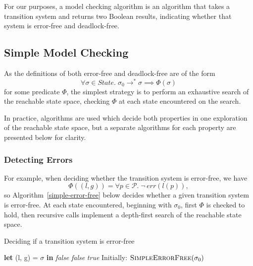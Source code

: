 \documentclass[12pt,a4paper,twoside,openright]{report}
\newcommand{\Let}[2]{\State \textbf{let} #1 = #2 \textbf{in}}
\begin{document}
For our purposes, a model checking algorithm is an
algorithm that takes a transition system and returns
two Boolean results, indicating whether that system
is error-free and deadlock-free.

\subsection{Simple Model Checking} \label{sec:simple-model-checking}
As the definitions of both error-free and deadlock-free
are of the form
\[
	\forall \sigma \in \textit{State}.\; \sigma_0 \longrightarrow^* \sigma
	\implies \Phi (\sigma)
\]
for some predicate $\Phi$, the simplest strategy is to
perform an exhaustive search of the reachable state space,
checking $\Phi$ at each state encountered on the search.

In practice, algorithms are used which decide both
properties in one exploration of the reachable state space,
but a separate algorithms for each property are presented
below for clarity.

\subsubsection{Detecting Errors}
For example, when deciding whether the transition system
is error-free, we have
\[
	\Phi((l, g)) = \forall p \in \mathcal{P}.\; \neg\,err(l(p)),
\]
so Algorithm~\ref{simple-error-free} below decides whether a given transition system
is error-free. At each
state encountered, beginning with $\sigma_0$, first $\Phi$
is checked to hold, then recursive calls implement a
depth-first search of the reachable state space.

\begin{algorithm} \caption{Deciding if a transition system is error-free}
	\label{simple-error-free} \begin{algorithmic}[1]
	\Let{(l, g)}{$\sigma$}
		\Return \textit{false}
		\EndIf
	\EndFor {}
		\Return \textit{false}
		\EndIf
	\EndFor
	\State \Return \textit{true}
	\EndProcedure
	\State
	\State Initially: $\textsc{SimpleErrorFree}(\sigma_0)$
\end{algorithmic} \end{algorithm}
\end{document}
